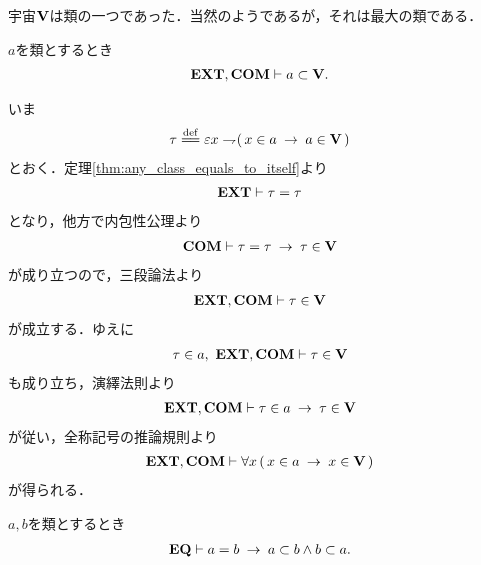 	宇宙$\mathbf{V}$は類の一つであった．当然のようであるが，それは最大の類である．
	\begin{screen}
		\begin{thm}
			$a$を類とするとき
			\begin{align}
				\mbox{{\bf EXT}},\mbox{\bf COM} \vdash a \subset \mathbf{V}.
			\end{align}
		\end{thm}
	\end{screen}
	
	\begin{sketch}
		いま
		\begin{align}
			\tau \defeq \varepsilon x \negation (\, x \in a \rarrow a \in \Univ\, )
		\end{align}
		とおく．定理\ref{thm:any_class_equals_to_itself}より
		\begin{align}
			\mbox{{\bf EXT}} \vdash \tau = \tau
		\end{align}
		となり，他方で内包性公理より
		\begin{align}
			\mbox{\bf COM} \vdash \tau = \tau \hspace{0.25em}\rightarrow\hspace{0.25em} \tau \in \mathbf{V}
		\end{align}
		が成り立つので，三段論法より
		\begin{align}
			\mbox{{\bf EXT}},\mbox{\bf COM} \vdash \tau \in \mathbf{V}
		\end{align}
		が成立する．ゆえに
		\begin{align}
			\tau \in a,\ \mbox{{\bf EXT}},\mbox{\bf COM} \vdash \tau \in \mathbf{V}
		\end{align}
		も成り立ち，演繹法則より
		\begin{align}
			\mbox{{\bf EXT}},\mbox{\bf COM} \vdash \tau \in a \hspace{0.25em}\rightarrow\hspace{0.25em} \tau \in \mathbf{V}
		\end{align}
		が従い，全称記号の推論規則より
		\begin{align}
			\mbox{{\bf EXT}},\mbox{\bf COM} \vdash \forall x\, (\, x \in a \hspace{0.25em}\rightarrow\hspace{0.25em} x \in \mathbf{V}\, )
		\end{align}
		が得られる．
		\QED
	\end{sketch}
	
	\begin{screen}
		\begin{thm}[等しい類は相手を包含する]
		\label{thm:equivalent_classes_includes_the_other}
			$a,b$を類とするとき
			\begin{align}
				\mbox{{\bf EQ}} \vdash a = b \hspace{0.25em}\rightarrow\hspace{0.25em} a \subset b \wedge b \subset a.
			\end{align}
		\end{thm}
	\end{screen}
	
